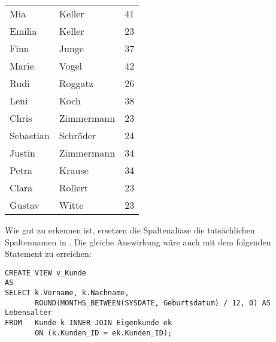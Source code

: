         \begin{center}
          \begin{small}
            \tablehead{}

            \begin{oraclesql}
              \begin{supertabular}{llr}
                Mia & Keller & 41 \\
                Emilia & Keller & 23 \\
                Finn & Junge & 37 \\
                Marie & Vogel & 42 \\
                Rudi & Roggatz & 26 \\
                Leni & Koch & 38 \\
                Chris & Zimmermann & 23 \\
                Sebastian & Schr\"oder & 24 \\
                Justin & Zimmermann & 34 \\
                Petra & Krause & 34 \\
                Clara & Rollert & 23 \\
                Gustav & Witte & 23 \\
              \end{supertabular}
            \end{oraclesql}
          \end{small}
        \end{center}
        Wie gut zu erkennen ist, ersetzen die Spaltenaliase die tats\"achlichen Spaltennamen in . Die gleiche Auswirkung w\"are auch mit dem folgenden Statement zu erreichen:
        \begin{lstlisting}[language=oracle_sql,caption={Eine einfache View mit Spaltenaliasen},label=sql08_30]
CREATE VIEW v_Kunde
AS
SELECT k.Vorname, k.Nachname,
       ROUND(MONTHS_BETWEEN(SYSDATE, Geburtsdatum) / 12, 0) AS Lebensalter
FROM   Kunde k INNER JOIN Eigenkunde ek
       ON (k.Kunden_ID = ek.Kunden_ID);
        \end{lstlisting}
